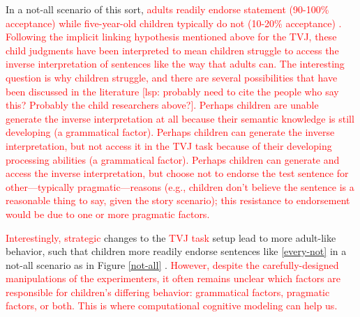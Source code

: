 \documentclass[preprint,authoryear]{elsarticle}\frenchspacing
\newcommand{\lsp}[1]{\textcolor{red}{[lsp: #1]}}
\newcommand{\lp}[1]{\textcolor{red}{#1}} %
\begin{document}
In a not-all scenario of this sort, \lp{adults readily endorse statement \Last 
(90-100\% acceptance)
while five-year-old children typically do not (10-20\% acceptance) \citep{musolino1998,lidzmusolino2002,musolinolidz2006,musolino2006structure,viauetal2010,tieu2015}. }
\lp{Following the implicit linking hypothesis mentioned above for the TVJ, these child judgments have been interpreted to mean children struggle to access the inverse interpretation of sentences like \Last the way that adults can.} 
\lp{The interesting question is {why children struggle}, and there are several possibilities that have been discussed in the literature \lsp{probably need to cite the people who say this? Probably the child researchers above?}. 
Perhaps children are unable generate the inverse interpretation at all because their semantic knowledge is still developing (a grammatical factor). 
Perhaps children can generate the inverse interpretation, but not access it in the TVJ task because of their developing processing abilities (a grammatical factor).
Perhaps children can generate and access the inverse interpretation, but choose not to endorse the test sentence for other---typically pragmatic---reasons (e.g., children don't believe the sentence is a reasonable thing to say, given the story scenario); this resistance to endorsement would be due to one or more pragmatic factors.
}

\lp{Interestingly,} \lp{strategic} changes to the 
\lp{TVJ task}
setup lead to more adult-like behavior, such that children more readily endorse sentences like \ref{every-not} in a not-all scenario as in Figure \ref{not-all} \citep{viauetal2010}. 
\lp{However, despite the carefully-designed manipulations of the experimenters, it often remains unclear which factors are responsible for children's differing behavior: grammatical factors, pragmatic factors, or both. This is where computational cognitive modeling can help us.}
\end{document}
